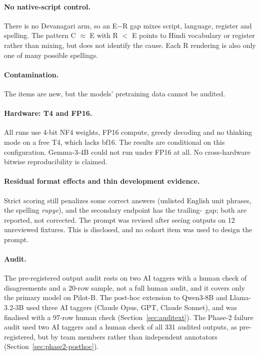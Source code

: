 \documentclass[12pt,a4paper,oneside]{report}
\renewcommand{\_}{\oldunderscore\allowbreak}
\newcommand{\rs}{\rupee}
\begin{document}
\paragraph{No native-script control.} There is no Devanagari arm, so an E$-$R gap mixes script, language, register and spelling. The pattern C $\approx$ E with R $<$ E points to Hindi vocabulary or register rather than mixing, but does not identify the cause. Each R rendering is also only one of many possible spellings.

\paragraph{Contamination.} The items are new, but the models' pretraining data cannot be audited.

\paragraph{Hardware: T4 and FP16.} All runs use 4-bit NF4 weights, FP16 compute, greedy decoding and no thinking mode on a free T4, which lacks bf16. The results are conditional on this configuration. Gemma-3-4B could not run under FP16 at all. No cross-hardware bitwise reproducibility is claimed.

\paragraph{Residual format effects and thin development evidence.} Strict scoring still penalizes some correct answers (unlisted English unit phrases, the spelling \emph{rupye}), and the secondary endpoint has the trailing-\rs\ gap; both are reported, not corrected. The prompt was revised after seeing outputs on 12 unreviewed fixtures. This is disclosed, and no cohort item was used to design the prompt.

\paragraph{Audit.} The pre-registered output audit rests on two AI taggers with a human check of disagreements and a 20-row sample, not a full human audit, and it covers only the primary model on Pilot-B. The post-hoc extension to Qwen3-8B and Llama-3.2-3B used three AI taggers (Claude Opus, GPT, Claude Sonnet), and was finalised with a 97-row human check (Section~\ref{sec:auditext}). The Phase-2 failure audit used two AI taggers and a human check of all 331 audited outputs, as pre-registered, but by team members rather than independent annotators (Section~\ref{sec:phase2-posthoc}).
\end{document}
